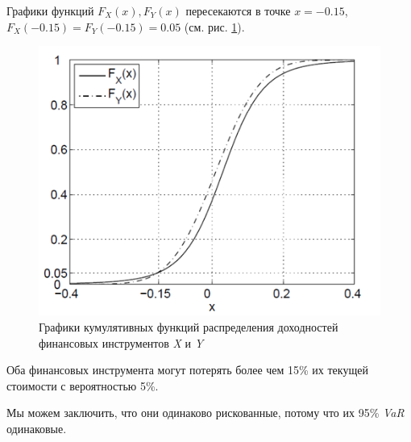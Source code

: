 \documentclass[financial_risks_lectures.tex]{subfiles}
\begin{document}
\begin{frame}[shrink=25]
Графики функций $F_X(x), F_Y(x)$ пересекаются в точке $x=-0.15$, $F_X(-0.15)=F_Y(-0.15) = 0.05$ (см. рис. \ref{fig:cdfs}). 
\begin{figure}
	\centering
	\includegraphics[scale=0.6]{img/expected_shortfall_cdfs.png}
	\caption{Графики кумулятивных функций распределения доходностей финансовых инструментов \textit{X }и \textit{Y}}\label{fig:cdfs}
\end{figure}
Оба финансовых инструмента могут потерять более чем 15\% их текущей стоимости с вероятностью 5\%. 

Мы можем заключить, что они одинаково рискованные, потому что их 95\% \textit{VaR} одинаковые.  
\end{frame}
\end{document}

